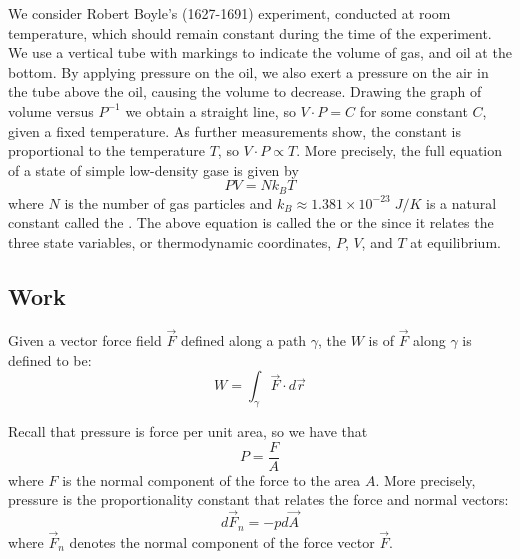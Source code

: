 \documentclass[12pt, a4paper, oneside, openright, titlepage]{book}
\begin{document}
We consider Robert Boyle's (1627-1691) experiment, conducted at room temperature, which should remain constant during the time of the experiment. We use a vertical tube with markings to indicate the volume of gas, and oil at the bottom. By applying pressure on the oil, we also exert a pressure on the air in the tube above the oil, causing the volume to decrease. Drawing the graph of volume versus $P^{-1}$ we obtain a straight line, so $V\cdot P = C$ for some constant $C$, given a fixed temperature. As further measurements show, the constant is proportional to the temperature $T$, so $V\cdot P \propto T$. More precisely, the full equation of a state of simple low-density gase is given by \begin{equation}
    \boxed{PV = Nk_BT}
\end{equation}
where $N$ is the number of gas particles and $k_B \approx 1.381\times 10^{-23}\;J/K$ is a natural constant called the . The above equation is called the  or the  since it relates the three state variables, or thermodynamic coordinates, $P$, $V$, and $T$ at equilibrium.





\subsection{Work}

\begin{defn}
    Given a vector force field $\vec{F}$ defined along a path $\gamma$, the  $W$ is of $\vec{F}$ along $\gamma$ is defined to be: \begin{equation}
        W = \int_{\gamma}\vec{F}\cdot d\vec{r}
    \end{equation}
\end{defn}

\begin{rec}
    Recall that pressure is force per unit area, so we have that \begin{equation*}
        P = \frac{F}{A}
    \end{equation*}
    where $F$ is the normal component of the force to the area $A$. More precisely, pressure is the proportionality constant that relates the force and normal vectors: \begin{equation*}
        d\vec{F}_n = -pd\vec{A}
    \end{equation*}
    where $\vec{F}_n$ denotes the normal component of the force vector $\vec{F}$.
\end{rec}
\end{document}
